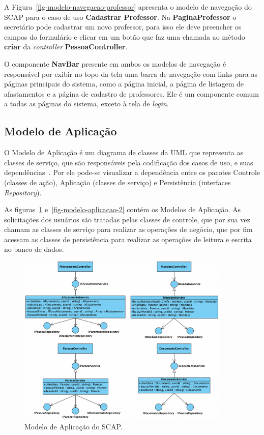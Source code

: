 A Figura~\ref{fig-modelo-navegacao-professor} apresenta o modelo de navegação do SCAP para o caso de uso
\textbf{Cadastrar Professor}. Na \textbf{PaginaProfessor} o secretário pode cadastrar um novo professor,
para isso ele deve preencher os campos do formulário e clicar em um botão que faz uma chamada ao método
\textbf{criar} da \textit{controller} \textbf{PessoaController}.


O componente \textbf{NavBar} presente em ambos os modelos de navegação é responsável por exibir
no topo da tela uma barra de navegação com links para as páginas principais do sistema, como a página inicial,
a página de listagem de afastamentos e a página de cadastro de professores. Ele é um componente
comum a todas as páginas do sistema, exceto à tela de \textit{login}.

\subsection{Modelo de Aplicação}
\label{subsec-frameweb-aplicacao}
O Modelo de Aplicação é um diagrama de classes da UML que representa as classes de
serviço, que são responsáveis pela codificação dos casos de uso, e suas dependências~\cite{souza:2007}.
Por ele pode-se visualizar a dependência entre os pacotes Controle (classes de ação),
Aplicação (classes de serviço) e Persistência (interfaces \textit{Repository}). 

As figuras~\ref{fig-modelo-aplicacao-1} e~\ref{fig-modelo-aplicacao-2} contém os Modelos de Aplicação.
As solicitações dos usuários são tratadas pelas classes de controle, que por sua vez
chamam as classes de serviço para realizar as operações de negócio, que por fim acessam
as classes de persistência para realizar as operações de leitura e escrita no banco de dados.


\begin{figure}[h!]
    \centering
    \includegraphics[width=0.9\textwidth]{figuras/fig-modelo-apl-1.png}
    \caption{Modelo de Aplicação do SCAP.}
    \label{fig-modelo-aplicacao-1}
\end{figure}

